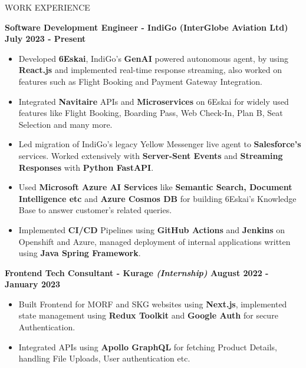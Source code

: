 \documentclass{resume} %
\begin{document}
\begin{rSection}{WORK EXPERIENCE}

{\bf Software Development Engineer - IndiGo (InterGlobe Aviation Ltd)  \hfill July 2023 - Present }
\begin{itemize}
    \item {\normalfont Developed \textbf{6Eskai}, IndiGo's \textbf{GenAI} powered autonomous agent, by using \textbf{React.js} and implemented real-time response streaming, also worked on features such as Flight Booking and Payment Gateway Integration.}
    \item{\normalfont Integrated \textbf{Navitaire} APIs and \textbf{Microservices} on 6Eskai for widely used features like Flight Booking, Boarding Pass, Web Check-In, Plan B, Seat Selection and many more.}
    \item {\normalfont Led migration of IndiGo's legacy Yellow Messenger live agent to \textbf{Salesforce's} services. Worked extensively with \textbf{Server-Sent Events} and \textbf{Streaming Responses} with \textbf{Python FastAPI}.}
    \item {\normalfont Used \textbf{Microsoft Azure AI Services} like \textbf{Semantic Search, Document Intelligence etc} and \textbf{Azure Cosmos DB} for building 6Eskai's Knowledge Base to answer customer's related queries.}
    \item {\normalfont Implemented \textbf{CI/CD} Pipelines using \textbf{GitHub Actions} and \textbf{Jenkins} on Openshift and Azure, managed deployment of internal applications written using \textbf{Java Spring Framework}.}
\end{itemize}


{\bf Frontend Tech Consultant - Kurage {\normalfont \emph{(Internship)}}  \hfill August 2022 - January 2023 }
\begin{itemize}

    \item {\normalfont Built Frontend for MORF and SKG websites using \textbf{Next.js}, implemented state management using 
 \textbf{Redux Toolkit} and \textbf{Google Auth} for secure Authentication.}
   \item {\normalfont Integrated APIs using \textbf{{Apollo GraphQL}} for fetching Product Details, handling File Uploads, User authentication etc.} 
\end{itemize}

\end{rSection}


\end{document}
